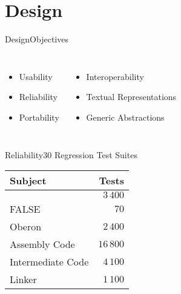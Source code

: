 \section{Design}

\begin{frame}{Design}{Objectives}
\begin{columns}[T]
\column{6em}
\begin{itemize}
\item Usability \bigskip
\item Reliability \bigskip
\item Portability \bigskip
\end{itemize}
\column{12em}
\begin{itemize}
\item Interoperability \bigskip
\item Textual Representations \bigskip
\item Generic Abstractions \bigskip
\end{itemize}
\end{columns}
\end{frame}

\begin{frame}{Reliability}{30 Regression Test Suites} %
\begin{center}
\begin{tabular}{@{}lr@{}}
\toprule Subject & Tests \\ \midrule
\cpp{} & $3\,400$ \\ %
FALSE & $70$ \\ %
Oberon & $2\,400$ \\ %
Assembly Code& $16\,800$ \\ %
Intermediate Code & $4\,100$ \\ %
Linker & $1\,100$ \\ %
\bottomrule
\end{tabular}
\end{center}
\end{frame}

